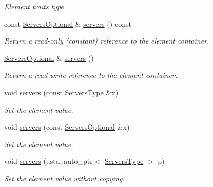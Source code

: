\begin{DoxyCompactItemize}
\begin{DoxyCompactList}\small\item\em Element traits type. \item\end{DoxyCompactList}\item 
const \hyperlink{classopenstack_1_1xml_1_1SharedIpGroup_a987e218ca594e96753368aa17270c78b}{ServersOptional} \& \hyperlink{classopenstack_1_1xml_1_1SharedIpGroup_a1d918307f720772080a61e38f7fe398f}{servers} () const 
\begin{DoxyCompactList}\small\item\em Return a read-\/only (constant) reference to the element container. \item\end{DoxyCompactList}\item 
\hyperlink{classopenstack_1_1xml_1_1SharedIpGroup_a987e218ca594e96753368aa17270c78b}{ServersOptional} \& \hyperlink{classopenstack_1_1xml_1_1SharedIpGroup_a56fbef2dbb627b923015d203723d5851}{servers} ()
\begin{DoxyCompactList}\small\item\em Return a read-\/write reference to the element container. \item\end{DoxyCompactList}\item 
void \hyperlink{classopenstack_1_1xml_1_1SharedIpGroup_a6086c55cf9822987f09e62e9698839ef}{servers} (const \hyperlink{classopenstack_1_1xml_1_1ServerIDList}{ServersType} \&x)
\begin{DoxyCompactList}\small\item\em Set the element value. \item\end{DoxyCompactList}\item 
void \hyperlink{classopenstack_1_1xml_1_1SharedIpGroup_a5dce4e185ade93d8efc8b04b74e10d7c}{servers} (const \hyperlink{classopenstack_1_1xml_1_1SharedIpGroup_a987e218ca594e96753368aa17270c78b}{ServersOptional} \&x)
\begin{DoxyCompactList}\small\item\em Set the element value. \item\end{DoxyCompactList}\item 
void \hyperlink{classopenstack_1_1xml_1_1SharedIpGroup_a093a59403eb05dc3cb6ba50e4ec160eb}{servers} (::std::auto\_\-ptr$<$ \hyperlink{classopenstack_1_1xml_1_1ServerIDList}{ServersType} $>$ p)
\begin{DoxyCompactList}\small\item\em Set the element value without copying. \item\end{DoxyCompactList}\end{DoxyCompactItemize}
